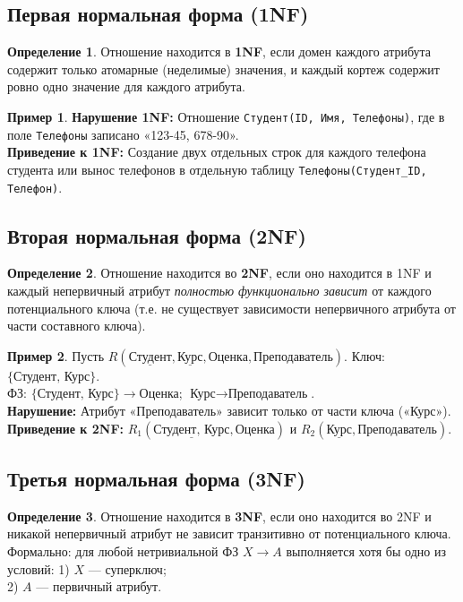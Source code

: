 \documentclass[12pt,a4paper]{article}
\theoremstyle{definition}
\newtheorem{definition}{Определение}
\newtheorem{example}{Пример}
\theoremstyle{plain}
\begin{document}
\subsection{Первая нормальная форма (1NF)}
\begin{definition}
Отношение находится в \textbf{1NF}, если домен каждого атрибута содержит только атомарные (неделимые) значения, и каждый кортеж содержит ровно одно значение для каждого атрибута.
\end{definition}

\begin{example}
\textbf{Нарушение 1NF:} Отношение \texttt{Студент(ID, Имя, Телефоны)}, где в поле \texttt{Телефоны} записано «123-45, 678-90». \\
\textbf{Приведение к 1NF:} Создание двух отдельных строк для каждого телефона студента или вынос телефонов в отдельную таблицу \texttt{Телефоны(Студент\_ID, Телефон)}.
\end{example}

\subsection{Вторая нормальная форма (2NF)}
\begin{definition}
Отношение находится во \textbf{2NF}, если оно находится в 1NF и каждый непервичный атрибут \textit{полностью функционально зависит} от каждого потенциального ключа (т.е. не существует зависимости непервичного атрибута от части составного ключа).
\end{definition}

\begin{example}
Пусть $R(\underline{\text{Студент}}, \underline{\text{Курс}}, \text{Оценка}, \text{Преподаватель})$. Ключ: $\{\text{Студент, Курс}\}$. \\
ФЗ: $\{\text{Студент, Курс}\} \to \text{Оценка}$; $\text{Курс} \to \text{Преподаватель}$. \\
\textbf{Нарушение:} Атрибут «Преподаватель» зависит только от части ключа («Курс»). \\
\textbf{Приведение к 2NF:} $R_1(\underline{\text{Студент, Курс}}, \text{Оценка})$ и $R_2(\underline{\text{Курс}}, \text{Преподаватель})$.
\end{example}

\subsection{Третья нормальная форма (3NF)}
\begin{definition}
Отношение находится в \textbf{3NF}, если оно находится во 2NF и никакой непервичный атрибут не зависит транзитивно от потенциального ключа. Формально: для любой нетривиальной ФЗ $X \to A$ выполняется хотя бы одно из условий:
1) $X$ — суперключ; \\
2) $A$ — первичный атрибут.
\end{definition}
\end{document}
